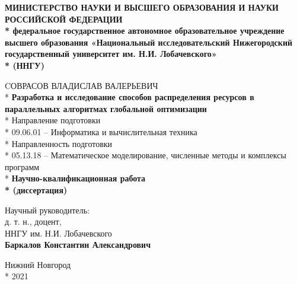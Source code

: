 \begin{titlepage}

\begin{center}
  \fontsize{12pt}{0pt}
  \textbf{МИНИСТЕРСТВО НАУКИ И ВЫСШЕГО ОБРАЗОВАНИЯ И НАУКИ РОССИЙСКОЙ ФЕДЕРАЦИИ \\*
федеральное государственное автономное образовательное учреждение высшего образования
«Национальный исследовательский Нижегородский государственный университет им. Н.И.
Лобачевского»\\*
(ННГУ)}
\end{center}

\vspace{12pt}
\vspace{25pt}

\begin{center}
\fontsize{14pt}{0pt}

\vspace{12pt}

CОВРАСОВ ВЛАДИСЛАВ ВАЛЕРЬЕВИЧ\\*
\vspace{12pt}
\vspace{25pt}
\textbf{Разработка и исследование способов распределения ресурсов в
параллельных алгоритмах глобальной оптимизации}\\*
\vspace{14pt}
\fontsize{12pt}{0pt}
  Направление подготовки\\*
09.06.01 – Информатика и вычислительная
техника\\*
\vspace{14pt}
Направленность подготовки\\*
05.13.18 – Математическое моделирование,
численные методы и комплексы программ\\*
\vspace{14pt}
\vspace{14pt}
\fontsize{14pt}{0pt}
\textbf{Научно-квалификационная работа\\*
(диссертация)}
\end{center}

\vspace{40pt}


\fontsize{12pt}{0pt}
\begin{flushright}
Научный руководитель:\\
\vspace{14pt}
д. т. н., доцент,\\
ННГУ им. Н.И. Лобачевского\\
\textbf{Баркалов Константин Александрович}\\
\end{flushright}

\vspace{30pt}

\vspace{\fill}

\begin{center}
Нижний Новгород \\*
2021
\end{center}

\end{titlepage}
